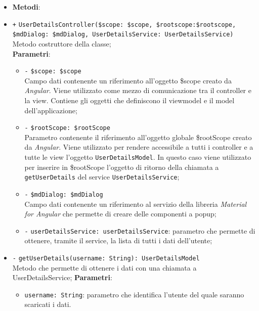\begin{itemize}
	\begin{itemize}
		\item \textbf{Metodi}:
		\item \texttt{+} \texttt{UserDetailsController(\$scope: \$scope, \$rootscope:\$rootscope, \$mdDialog: \$mdDialog, UserDetailsService: UserDetailsService)} \\ Metodo costruttore della classe;\\
		\textbf{Parametri}: 
		\begin{itemize}
			\item \texttt{-} \texttt{\$scope: \$scope} \\
			Campo dati contenente un riferimento all’oggetto \$scope creato da \textit{Angular}. Viene utilizzato come mezzo di comunicazione tra il controller e la view. Contiene gli oggetti che definiscono il viewmodel e il model dell’applicazione;
			\item \texttt{-} \texttt{\$rootScope: \$rootScope} \\
			Parametro contenente il riferimento all'oggetto globale \$rootScope creato da \textit{Angular}. Viene utilizzato per rendere accessibile a tutti i controller e a tutte le view l'oggetto \texttt{UserDetailsModel}. In questo caso viene utilizzato per inserire in \$rootScope l'oggetto di ritorno della chiamata a \texttt{getUserDetails} del service \texttt{UserDetailsService};
			\item \texttt{-} \texttt{\$mdDialog: \$mdDialog} \\
			Campo dati contenente un riferimento al servizio della libreria \textit{Material for Angular} che permette di creare delle componenti a popup;
			\item \texttt{-} \texttt{userDetailsService: userDetailsService}: parametro che permette di ottenere, tramite il service, la lista di tutti i dati dell'utente;
		\end{itemize}
		\item \texttt{-} \texttt{getUserDetails(username: String): UserDetailsModel} \\ Metodo che permette di ottenere i dati con una chiamata a UserDetailsService;
		\textbf{Parametri}:
		\begin{itemize}
			\item \texttt{username: String}: parametro che identifica l'utente del quale saranno scaricati i dati.
		\end{itemize}
	\end{itemize}
\end{itemize}


